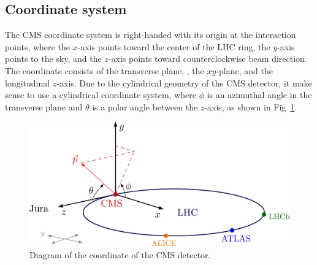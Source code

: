 \subsection{Coordinate system}
The CMS coordinate system is right-handed with its origin at the interaction points, where the $x$-axis points toward the center of the LHC ring, the $y$-axis points to the sky, and the $z$-axis points toward counterclockwise beam direction.
The coordinate consists of the transverse plane, \ie, the $xy$-plane, and the longitudinal $z$-axis.
Due to the cylindrical geometry of the CMS detector, it make sense to use a cylindrical coordinate system, where $\phi$ is an azimuthal angle in the transverse plane and $\theta$ is a polar angle between the $z$-axis, as shown in Fig~\ref{fig:cms_coord}.
\begin{figure}\centering
    \includegraphics[width=\textwidth]{figure/cms_coord.png}
    \caption{Diagram of the coordinate of the CMS detector.}
    \label{fig:cms_coord}
\end{figure}

